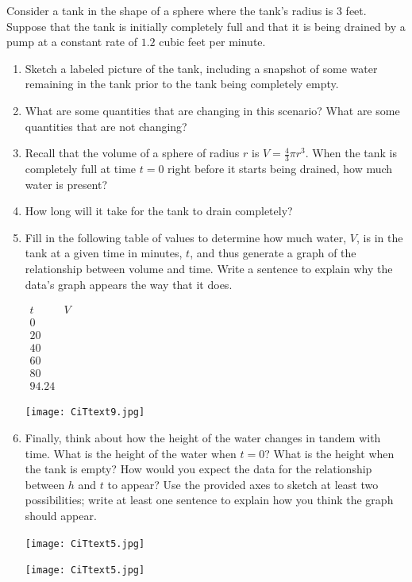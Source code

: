\documentclass{ximera}
\begin{document}
\begin{exploration}

Consider a tank in the shape of a sphere where the tank's radius is $3$ feet.  Suppose that the tank is initially completely full and that it is being drained by a pump at a constant rate of $1.2$ cubic feet per minute.%

\begin{enumerate}[label=\alph*.]
\item Sketch a labeled picture of the tank, including a snapshot of some water remaining in the tank prior to the tank being completely empty.%
\item What are some quantities that are changing in this scenario?  What are some quantities that are not changing?%
\item Recall that the volume of a sphere of radius $r$ is $V = \frac{4}{3} \pi r^3$.  When the tank is completely full at time $t = 0$ right before it starts being drained, how much water is present?%
\item How long will it take for the tank to drain completely?%
\item Fill in the following table of values to determine how much water, $V$, is in the tank at a given time in minutes, $t$, and thus generate a graph of the relationship between volume and time.  Write a sentence to explain why the data's graph appears the way that it does.%

\begin{center}
$
\begin{array}{cc}
t&V\\
\hline
0&\\
20&\\
40&\\
60&\\
80&\\
94.24&
\end{array}
$
\end{center}

\begin{image}
\texttt{[image: CiTtext9.jpg]}
\end{image}

\item Finally, think about how the height of the water changes in tandem with time. What is the height of the water when $t = 0$?  What is the height when the tank is empty?  How would you expect the data for the relationship between $h$ and $t$ to appear?  Use the provided axes to sketch at least two possibilities; write at least one sentence to explain how you think the graph should appear.%

\begin{image}
\texttt{[image: CiTtext5.jpg]}
\end{image}

\begin{image}
\texttt{[image: CiTtext5.jpg]}
\end{image}

\end{enumerate}
\end{exploration}
\end{document}
